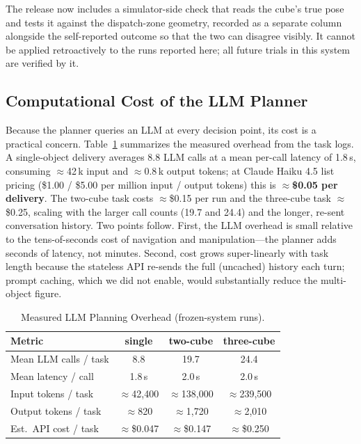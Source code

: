 \documentclass[conference]{IEEEtran}
\begin{document}
The release now includes a simulator-side check that reads the cube's true
pose and tests it against the dispatch-zone geometry, recorded as a
separate column alongside the self-reported outcome so that the two can
disagree visibly. It cannot be applied retroactively to the runs reported
here; all future trials in this system are verified by it.

\subsection{Computational Cost of the LLM Planner}

Because the planner queries an LLM at every decision point, its cost is a
practical concern. Table~\ref{tab:cost} summarizes the measured overhead from
the task logs. A single-object delivery averages 8.8 LLM calls at a mean
per-call latency of 1.8\,s, consuming $\approx$42\,k input and $\approx$0.8\,k
output tokens; at Claude Haiku 4.5 list pricing (\$1.00 / \$5.00 per
million input / output tokens) this is \textbf{$\approx$\$0.05 per delivery}.
The two-cube task costs $\approx$\$0.15 per run and the three-cube task
$\approx$\$0.25, scaling with the larger call counts (19.7 and 24.4) and the
longer, re-sent conversation history. Two points follow.
First, the LLM overhead is small relative to the tens-of-seconds cost of
navigation and manipulation---the planner adds seconds of latency, not
minutes. Second, cost grows super-linearly with task length because the
stateless API re-sends the full (uncached) history each turn; prompt caching,
which we did not enable, would substantially reduce the multi-object figure.

\begin{table}[t]
\caption{Measured LLM Planning Overhead (frozen-system runs).}
\label{tab:cost}
\centering
\small
\begin{tabular}{@{}lccc@{}}
\toprule
\textbf{Metric} & \textbf{single} & \textbf{two-cube} & \textbf{three-cube} \\
\midrule
Mean LLM calls / task & 8.8 & 19.7 & 24.4 \\
Mean latency / call & 1.8\,s & 2.0\,s & 2.0\,s \\
Input tokens / task & $\approx$42{,}400 & $\approx$138{,}000 & $\approx$239{,}500 \\
Output tokens / task & $\approx$820 & $\approx$1{,}720 & $\approx$2{,}010 \\
Est.\ API cost / task & $\approx$\$0.047 & $\approx$\$0.147 & $\approx$\$0.250 \\
\bottomrule
\end{tabular}
\end{table}
\end{document}
